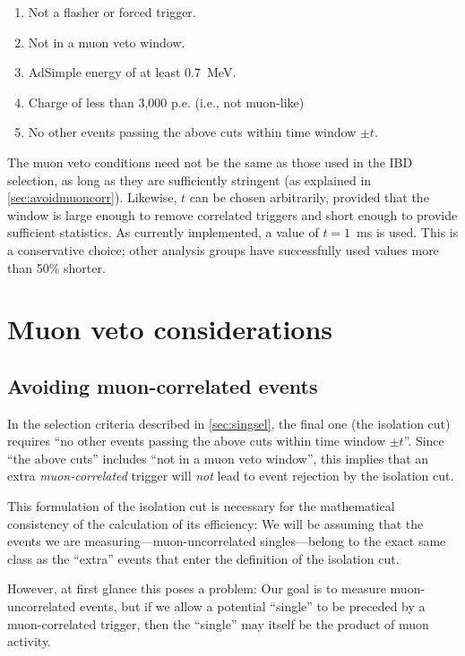 \documentclass[../thesis.tex]{subfiles}
\begin{document}
\begin{enumerate}
\item Not a flasher or forced trigger.
\item Not in a muon veto window.
\item AdSimple energy of at least 0.7~MeV.
\item Charge of less than 3,000 p.e. (i.e., not muon-like)
\item No other events passing the above cuts within time window $\pm t$.
\end{enumerate}

The muon veto conditions need not be the same as those used in the IBD
selection, as long as they are sufficiently stringent (as explained in
\autoref{sec:avoidmuoncorr}). Likewise, $t$ can be chosen arbitrarily, provided
that the window is large enough to remove correlated triggers and short enough
to provide sufficient statistics. As currently implemented, a value of $t =
1$~ms is used. This is a conservative choice; other analysis groups have
successfully used values more than 50\% shorter.

\section{Muon veto considerations}
\label{sec:muonventoconsider}

\subsection{Avoiding muon-correlated events}
\label{sec:avoidmuoncorr}

In the selection criteria described in \autoref{sec:singsel}, the final one
(the isolation cut) requires ``no other events passing the above cuts within
time window $\pm t$''. Since ``the above cuts'' includes ``not in a muon veto
window'', this implies that an extra \emph{muon-correlated} trigger will
\emph{not} lead to event rejection by the isolation cut.

This formulation of the isolation cut is necessary for the mathematical
consistency of the calculation of its efficiency: We will be assuming that the
events we are measuring---muon-uncorrelated singles---belong to the exact same
class as the ``extra'' events that enter the definition of the isolation cut.

However, at first glance this poses a problem: Our goal is to measure
muon-uncorrelated events, but if we allow a potential ``single'' to be preceded
by a muon-correlated trigger, then the ``single'' may itself be the product of
muon activity.
\end{document}
